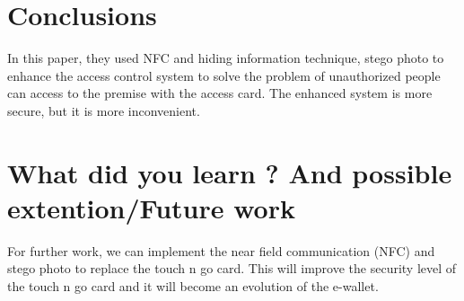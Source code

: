 \documentclass[•]{article}
\begin{document}
\section{Conclusions}
\hspace{1cm}In this paper, they used NFC and hiding information technique, stego photo to enhance the access control system to solve the problem of unauthorized people can access to the premise with the access card. The enhanced system is more secure, but it is more inconvenient. 

\section{What did you learn ? And  possible extention/Future work}
\hspace{1cm}For further work, we can implement the near field communication (NFC) and stego photo to replace the touch n go card. This will improve the security level of the touch n go card and it will become an evolution of the e-wallet.

\newpage
{}
\end{document}
